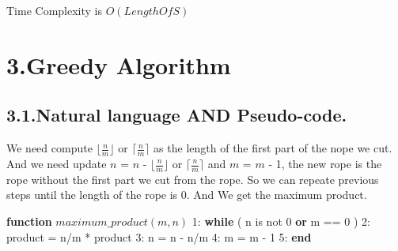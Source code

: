 \documentclass[10pt]{article}
\begin{document}
\noindent{}Time Complexity is $O(Length Of S)$%

\section{3.\hspace*{0.5em}Greedy Algorithm}\label{sec-greedy-algorithm}%

\subsection{3.1.\hspace*{0.5em}Natural language AND Pseudo-code.}\label{sec-natural-language-and-pseudo-code}%

\noindent{}\hspace*{1em}We need compute $\lfloor \frac{n}{m} \rfloor$ or $\lceil \frac{n}{m} \rceil$ as the length of
the first part of the nope we cut. And we need update $n$ = $n$ -  $\lfloor \frac{n}{m} \rfloor$ or $\lceil \frac{n}{m} \rceil$
and $m$ = $m$ - 1, the new rope is the rope without the first part we cut from the rope. So we can repeate 
previous steps until the length of the rope is 0. And We get the maximum product.    %

\mdhr{}%

\noindent{}\textbf{function} $maximum\_product(m,n)$\mdbr
{}1:  \textbf{while} ( n is not 0 \textbf{or} m == 0 )\mdbr
{}2: \hspace*{1em} product = n/m * product\mdbr
{}3: \hspace*{1em} n = n - n/m\mdbr
{}4: \hspace*{1em} m = m - 1\mdbr
{}5:  \textbf{end } %

\mdhr{}%
\end{document}

